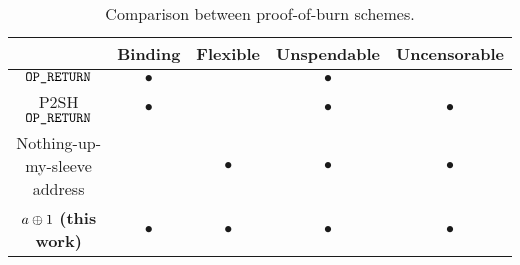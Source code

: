 \begin{table}[h!]
    \newcommand{\y}{$\bullet$}
    \newcommand{\n}{}
    \centering
    \caption{Comparison between proof-of-burn schemes.\label{table:comparison}}

    \begin{tabular}{ |c|c|c|c|c| }
     \hline
                                        & Binding & Flexible & Unspendable & Uncensorable \\
     \hline
     $\texttt{OP\_RETURN}$                        & \y      & \n       & \y          & \n \\
     P2SH $\texttt{OP\_RETURN}$                   & \y      & \n       & \y          & \y \\
     Nothing-up-my-sleeve address       & \n      & \y       & \y          & \y \\
     $a \oplus 1$ \textbf{(this work)}    & \y      & \y       & \y          & \y \\
     \hline
    \end{tabular}
\end{table}
